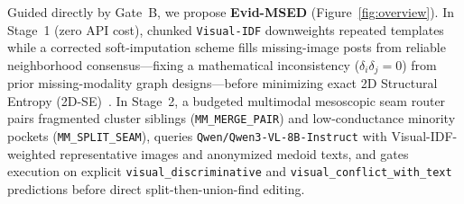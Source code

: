 Guided directly by Gate~B, we propose \textbf{Evid-MSED} (Figure~\ref{fig:overview}). In Stage~1 (zero API cost), chunked \texttt{Visual-IDF} downweights repeated templates while a corrected soft-imputation scheme fills missing-image posts from reliable neighborhood consensus---fixing a mathematical inconsistency ($\delta_i \delta_j = 0$) from prior missing-modality graph designs---before minimizing exact 2D Structural Entropy (2D-SE)~\cite{li2016structural,cao2024hisevent}. In Stage~2, a budgeted multimodal mesoscopic seam router~\cite{bai2025qwen3vl,wang2025cequel} pairs fragmented cluster siblings (\texttt{MM\_MERGE\_PAIR}) and low-conductance minority pockets (\texttt{MM\_SPLIT\_SEAM}), queries \texttt{Qwen/Qwen3-VL-8B-Instruct} with Visual-IDF-weighted representative images and anonymized medoid texts, and gates execution on explicit \texttt{visual\_discriminative} and \texttt{visual\_conflict\_with\_text} predictions before direct split-then-union-find editing.

